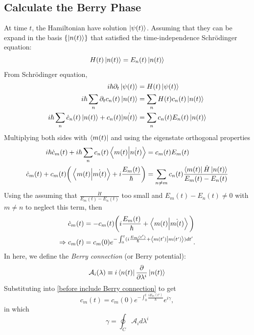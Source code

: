 \documentclass[unnumsec,webpdf,modern,large]{mam-authoring-template}%
\theoremstyle{thmstyleone}%
\theoremstyle{thmstyletwo}%
\theoremstyle{thmstylethree}%
\begin{document}
\begin{appendices}
\subsection{Calculate the Berry Phase}
\quad At time \(t\), the Hamiltonian have solution \(\ket{\psi(t)}\). Assuming that they can be expand in the basis \(\{\ket{n(t)}\}\) that satisfied the time-independence Schrödinger equation:
\begin{equation}
	H(t) \ket{n(t)} = E_n(t) \ket{n(t)}
\end{equation}
From Schrödinger equation,
\begin{align*}
	i\hbar \partial_t \ket{\psi(t)} &= H(t)  \ket{\psi(t)}\\
	i \hbar \sum_{n}\partial_t c_n(t) \ket{n(t)} &= \sum_{n}H(t) c_n(t)\ket{n(t)}\\
	i\hbar \sum_{n} \dot{c}_n(t) \ket{n(t)} + c_n(t) \dot{\ket{n(t)}} &= \sum_{n}c_n(t) E_n(t) \ket{n(t)}
\end{align*}
\quad Multiplying both sides with \(\bra{m(t)}\) and using the eigenstate orthogonal properties
\begin{align*}
	i\hbar \dot{c}_m(t) + i\hbar \sum_{n} c_n(t) \braket{m(t)}{\dot{n(t)}} &= c_m(t) E_m(t)\\
	\dot{c}_m (t) +  c_m(t) \bigg( \braket{m(t)}{\dot{m(t)}}+ i\frac{E_m(t)}{\hbar}\bigg) &= \sum_{n \neq m} c_n(t) \frac{\bra{m(t)} \dot{H} \ket{n(t)}}{E_m(t) - E_n(t)}
\end{align*}
\quad Using the assuming that \(\frac{\dot{H}}{E_m(t) - E_n(t)}\) too small and  \(E_m(t) - E_n(t) \neq 0\) with \(m \neq n\) to neglect this term, then
\begin{align}
	\dot{c}_m(t) &= -c_m(t) \bigg(i\frac{E_m(t)}{\hbar} + \braket{m(t)}{\dot{m(t)}}\bigg)\\
	\label{before include Berry connection}
	\Rightarrow c_m(t) &= c_m(0) e^{- \int_0^t(i\frac{E_m(t')}{\hbar} + \braket{m(t')}{\dot{m(t')}}) dt'}.
\end{align}
\quad In here, we define the \textit{Berry connection} (or Berry potential):
\begin{equation}\label{Berry con. def.}
	\mathcal{A}_i(\lambda) \equiv i\bra{n(t)} \pdv{ }{\lambda^i} \ket{n(t)}
\end{equation}
\quad Substituting into \eqref{before include Berry connection} to get
\begin{equation}
	c_m(t) = c_m(0) e^{-\int_0^t \frac{iE_m(t')}{\hbar}}e^{i\gamma},
\end{equation}
in which
$$\gamma = \oint_C \mathcal{A}_i d \lambda^i$$

\end{appendices}
\end{document}
